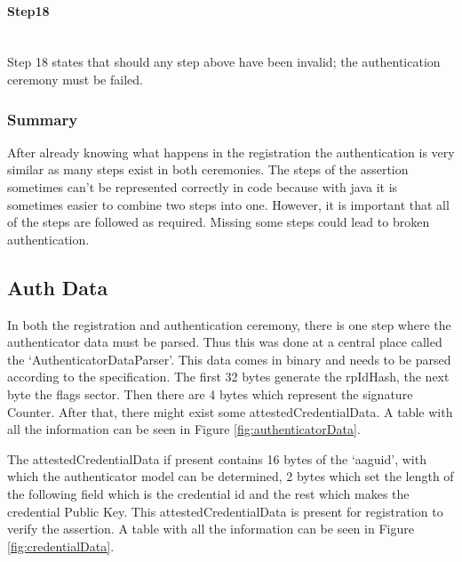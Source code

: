 \documentclass[a4paper, 11pt]{scrartcl}
\begin{document}
\paragraph{Step18}\hfill \\ 
Step 18 states that should any step above have been invalid; the authentication ceremony must be failed.

\subsubsection{Summary}
After already knowing what happens in the registration the authentication is very similar as many steps exist in both ceremonies. The steps of the assertion sometimes can't be represented correctly in code because with java it is sometimes easier to combine two steps into one. However, it is important that all of the steps are followed as required. Missing some steps could lead to broken authentication.

\subsection{Auth Data}
\label{sec:authData}
In both the registration and authentication ceremony, there is one step where the authenticator data must be parsed. Thus this was done at a central place called the `AuthenticatorDataParser'. This data comes in binary and needs to be parsed according to the specification. The first 32 bytes generate the rpIdHash, the next byte the flags sector. Then there are 4 bytes which represent the signature Counter. After that, there might exist some attestedCredentialData. A table with all the information can be seen in Figure \ref{fig:authenticatorData}.

The attestedCredentialData if present contains 16 bytes of the `aaguid', with which the authenticator model can be determined, 2 bytes which set the length of the following field which is the credential id and the rest which makes the credential Public Key. This attestedCredentialData is present for registration to verify the assertion. A table with all the information can be seen in Figure \ref{fig:credentialData}.
\end{document}
